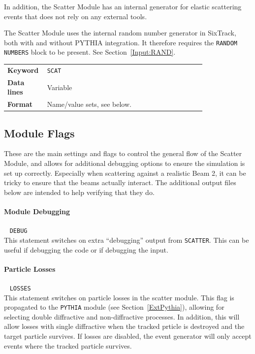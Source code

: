 In addition, the Scatter Module has an internal generator for elastic scattering events that does not rely on any external tools.

The Scatter Module uses the internal random number generator in SixTrack, both with and without PYTHIA integration.
It therefore requires the \texttt{RANDOM NUMBERS} block to be present.
See Section~\ref{Input:RAND}.

\bigskip
\begin{tabular}{@{}lp{0.8\linewidth}}
    \textbf{Keyword}    & \texttt{SCAT}\index{SCAT} \\
    \textbf{Data lines} & Variable \\
    \textbf{Format}     & Name/value sets, see below.
\end{tabular}

\subsection{Module Flags}

These are the main settings and flags to control the general flow of the Scatter Module, and allows for additional debugging options to ensure the simulation is set up correctly.
Especially when scattering against a realistic Beam 2, it can be tricky to ensure that the beams actually interact.
The additional output files below are intended to help verifying that they do.

\paragraph{Module Debugging}~ \texttt{DEBUG}\\

This statement switches on extra ``debugging'' output from \texttt{SCATTER}.
This can be useful if debugging the code or if debugging the input.

\paragraph{Particle Losses}~ \texttt{LOSSES}\\

This statement switches on particle losses in the scatter module.
This flag is propagated to the \texttt{PYTHIA} module (see Section~\ref{ExtPythia}), allowing for selecting double diffractive and non-diffractive processes.
In addition, this will allow losses with single diffractive when the tracked prticle is destroyed and the target particle survives.
If losses are disabled, the event generator will only accept events where the tracked particle survives.


